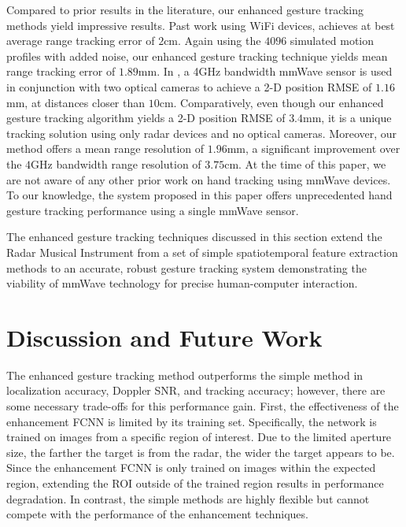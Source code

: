 \documentclass[10pt,journal,final]{IEEEtran}
\begin{document}
Compared to prior results in the literature, our enhanced gesture tracking methods yield impressive results. Past work using WiFi devices, \cite{mmWave_tracking:WiDeo} achieves at best average range tracking error of $2$cm. Again using the $4096$ simulated motion profiles with added noise, our enhanced gesture tracking technique yields mean range tracking error of $1.89$mm. In \cite{mmWave_tracking:ThuMouse}, a 4GHz bandwidth mmWave sensor is used in conjunction with two optical cameras to achieve a 2-D position RMSE of $1.16$mm, at distances closer than $10$cm. Comparatively, even though our enhanced gesture tracking algorithm yields a 2-D position RMSE of $3.4$mm, it is a unique tracking solution using only radar devices and no optical cameras. Moreover, our method offers a mean range resolution of $1.96$mm, a significant improvement over the $4$GHz bandwidth range resolution of $3.75$cm. At the time of this paper, we are not aware of any other prior work on hand tracking using mmWave devices. To our knowledge, the system proposed in this paper offers unprecedented hand gesture tracking performance using a single mmWave sensor.

The enhanced gesture tracking techniques discussed in this section extend the Radar Musical Instrument from a set of simple spatiotemporal feature extraction methods to an accurate, robust gesture tracking system demonstrating the viability of mmWave technology for precise human-computer interaction.

\section{Discussion and Future Work}
\label{sec:discussion}
The enhanced gesture tracking method outperforms the simple method in localization accuracy, Doppler SNR, and tracking accuracy; however, there are some necessary trade-offs for this performance gain. First, the effectiveness of the enhancement FCNN is limited by its training set. Specifically, the network is trained on images from a specific region of interest. Due to the limited aperture size, the farther the target is from the radar, the wider the target appears to be. Since the enhancement FCNN is only trained on images within the expected region, extending the ROI outside of the trained region results in performance degradation. In contrast, the simple methods are highly flexible but cannot compete with the performance of the enhancement techniques.
\end{document}
